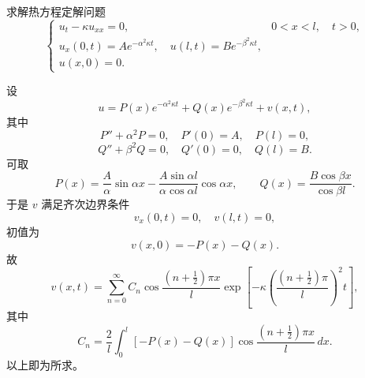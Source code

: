\begin{question}
求解热方程定解问题
\[
\begin{cases}
u_t-\kappa u_{xx}=0,&0<x<l,
\quad t>0,\\
u_x(0,t)=A e^{-\alpha^2\kappa t},
\quad u(l,t)=B e^{-\beta^2\kappa t},\\
u(x,0)=0.
\end{cases}
\]
\begin{solution}
设
\[
u=P(x)e^{-\alpha^2\kappa t}+Q(x)e^{-\beta^2\kappa t}+v(x,t),
\]
其中
\[
P''+\alpha^2P=0,
\quad P'(0)=A,
\quad P(l)=0,
\]
\[
Q''+\beta^2Q=0,
\quad Q'(0)=0,
\quad Q(l)=B.
\]
可取
\[
P(x)=\frac{A}{\alpha}\sin\alpha x
-\frac{A\sin\alpha l}{\alpha\cos\alpha l}\cos\alpha x,
\qquad
Q(x)=\frac{B\cos\beta x}{\cos\beta l}.
\]
于是 \(v\) 满足齐次边界条件
\[
v_x(0,t)=0,
\quad v(l,t)=0,
\]
初值为
\[
v(x,0)=-P(x)-Q(x).
\]
故
\[
v(x,t)=\sum_{n=0}^{\infty}C_n
\cos\frac{(n+\frac12)\pi x}{l}
\exp\left[-\kappa\left(\frac{(n+\frac12)\pi}{l}\right)^2t\right],
\]
其中
\[
C_n=\frac2l\int_0^l[-P(x)-Q(x)]
\cos\frac{(n+\frac12)\pi x}{l}\,dx.
\]
以上即为所求。
\end{solution}
\end{question}

